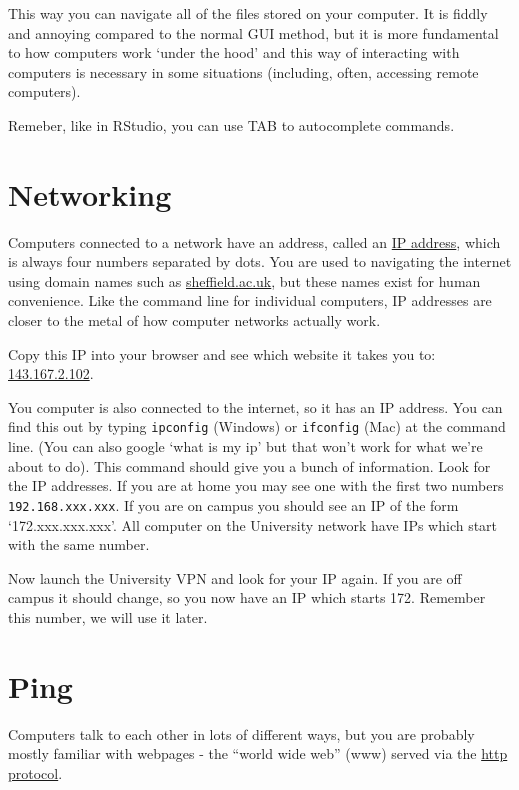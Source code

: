 \documentclass[
]{book}
\begin{document}
This way you can navigate all of the files stored on your computer. It is fiddly and annoying compared to the normal GUI method, but it is more fundamental to how computers work `under the hood' and this way of interacting with computers is necessary in some situations (including, often, accessing remote computers).

Remeber, like in RStudio, you can use TAB to autocomplete commands.

\hypertarget{networking}{%
\section{Networking}\label{networking}}

Computers connected to a network have an address, called an \href{https://en.wikipedia.org/wiki/Internet_Protocol}{IP address}, which is always four numbers separated by dots. You are used to navigating the internet using domain names such as \href{}{sheffield.ac.uk}, but these names exist for human convenience. Like the command line for individual computers, IP addresses are closer to the metal of how computer networks actually work.

Copy this IP into your browser and see which website it takes you to: \href{http://143.167.2.102}{143.167.2.102}.

You computer is also connected to the internet, so it has an IP address. You can find this out by typing \texttt{ipconfig} (Windows) or \texttt{ifconfig} (Mac) at the command line. (You can also google `what is my ip' but that won't work for what we're about to do). This command should give you a bunch of information. Look for the IP addresses. If you are at home you may see one with the first two numbers \texttt{192.168.xxx.xxx}. If you are on campus you should see an IP of the form `172.xxx.xxx.xxx'. All computer on the University network have IPs which start with the same number.

Now launch the University VPN and look for your IP again. If you are off campus it should change, so you now have an IP which starts 172. Remember this number, we will use it later.

\hypertarget{ping}{%
\section{Ping}\label{ping}}

Computers talk to each other in lots of different ways, but you are probably mostly familiar with webpages - the ``world wide web'' (www) served via the \href{https://en.wikipedia.org/wiki/Hypertext_Transfer_Protocol}{http protocol}.
\end{document}
